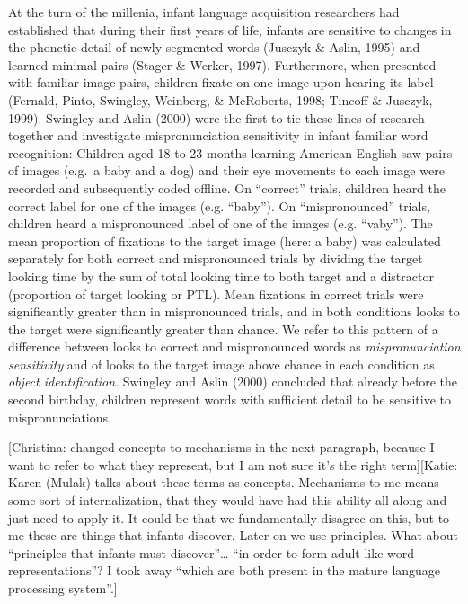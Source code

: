 \documentclass[man]{apa6}
\theoremstyle{definition}
\theoremstyle{definition}
\theoremstyle{definition}
\theoremstyle{remark}
\begin{document}
At the turn of the millenia, infant language acquisition researchers had
established that during their first years of life, infants are sensitive
to changes in the phonetic detail of newly segmented words (Jusczyk \&
Aslin, 1995) and learned minimal pairs (Stager \& Werker, 1997).
Furthermore, when presented with familiar image pairs, children fixate
on one image upon hearing its label (Fernald, Pinto, Swingley, Weinberg,
\& McRoberts, 1998; Tincoff \& Jusczyk, 1999). Swingley and Aslin (2000)
were the first to tie these lines of research together and investigate
mispronunciation sensitivity in infant familiar word recognition:
Children aged 18 to 23 months learning American English saw pairs of
images (e.g.~a baby and a dog) and their eye movements to each image
were recorded and subsequently coded offline. On \enquote{correct}
trials, children heard the correct label for one of the images (e.g.
\enquote{baby}). On \enquote{mispronounced} trials, children heard a
mispronounced label of one of the images (e.g. \enquote{vaby}). The mean
proportion of fixations to the target image (here: a baby) was
calculated separately for both correct and mispronounced trials by
dividing the target looking time by the sum of total looking time to
both target and a distractor (proportion of target looking or PTL). Mean
fixations in correct trials were significantly greater than in
mispronounced trials, and in both conditions looks to the target were
significantly greater than chance. We refer to this pattern of a
difference between looks to correct and mispronounced words as
\emph{mispronunciation sensitivity} and of looks to the target image
above chance in each condition as \emph{object identification}. Swingley
and Aslin (2000) concluded that already before the second birthday,
children represent words with sufficient detail to be sensitive to
mispronunciations.

{[}Christina: changed concepts to mechanisms in the next paragraph,
because I want to refer to what they represent, but I am not sure it's
the right term{]}{[}Katie: Karen (Mulak) talks about these terms as
concepts. Mechanisms to me means some sort of internalization, that they
would have had this ability all along and just need to apply it. It
could be that we fundamentally disagree on this, but to me these are
things that infants discover. Later on we use principles. What about
\enquote{principles that infants must discover}\ldots{} \enquote{in
order to form adult-like word representations}? I took away
\enquote{which are both present in the mature language processing
system}.{]}
\end{document}
